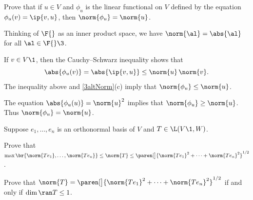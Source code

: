 \exercise
Prove that if $u \in V$ and $\phi_u$ is the linear functional on $V$ defined by the equation $\phi_u(v) = \ip{v, u}$, then
$\norm{\phi_u} = \norm{u}$.

\begin{Solution}
Thinking of $\F{}$ as an inner product space, we have $\norm{\al} = \abs{\al}$ for all $\al \in \F{}\3$.

If $v \in V\1$, then the Cauchy--Schwarz inequality shows that
\[
\abs{ \phi_u(v) } = \abs{ \ip{v, u} } \le \norm{u} \, \norm{v}.
\]
The inequality above and \ref{3altNorm}(c) imply that $\norm{\phi_u} \le \norm{u}$.

The equation $\abs{ \phi_u(u) } = \norm{u}^2$ implies that $\norm{\phi_u} \ge \norm{u}$. Thus $\norm{\phi_u} = \norm{u}$.
\end{Solution}

\exercise
Suppose $e_1, \ldots, e_n$ is an orthonormal basis of $V$ and $T \in \L(V\1,W)$.
\begin{subtheorem}
\item
Prove that
$\max\br{ \norm{Te_1}, \ldots, \norm{Te_n} }
\le \norm{T} \le \paren[\big]{ \norm{Te_1}^2 + \cdots + \norm{Te_n}^2 }^{1/2}\!$.
\item
Prove that $\norm{T} = \paren[\big]{ \norm{Te_1}^2 + \cdots + \norm{Te_n}^2 }^{1/2}$ if and only if $\dim \ran T \le 1$.
\end{subtheorem}

